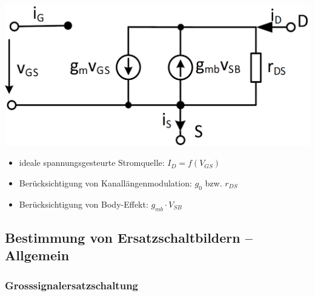 \begin{minipage}[t]{0.48\columnwidth}
    \includegraphics[width=\columnwidth, align=t]{images/02_MOSFET_Pi_Ersatzschaltung.png}
\end{minipage}
\hfill
\begin{minipage}[t]{0.48\columnwidth}
    \raggedright
    \begin{itemize}
        \item ideale spannungsgesteurte Stromquelle: $I_D = f(V_{GS})$
        \item Berücksichtigung von Kanallängenmodulation: $g_0$ bzw. $r_{DS}$
        \item Berücksichtigung von Body-Effekt: $g_{mb} \cdot V_{SB}$
    \end{itemize}
\end{minipage}






\subsection{Bestimmung von Ersatzschaltbildern -- Allgemein}
\subsubsection{Grosssignalersatzschaltung}


